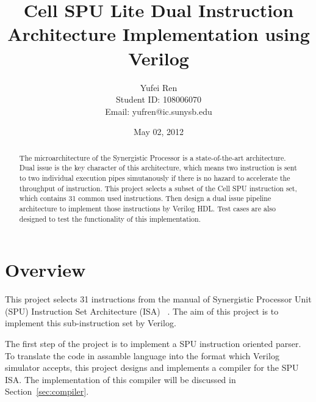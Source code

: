 \documentclass[preprint,authoryear,12pt]{elsarticle}
\begin{document}
\begin{frontmatter}

\title{Cell SPU Lite Dual Instruction Architecture Implementation using Verilog}


\author{
Yufei Ren\\
{\small Student ID: 108006070}\\
{\small Email: yufren@ic.sunysb.edu}}

\address{Department of Electrical and Computer Engineering\\
Stony Brook University, Stony Brook, New York
}

\date{May 02, 2012}

\maketitle

\begin{abstract}

The microarchitecture of the Synergistic Processor is a
state-of-the-art architecture. Dual issue is the key character of this
architecture, which means two instruction is sent to two individual
execution pipes simutanously if there is no hazard to accelerate the
throughput of instruction. This project selects a subset of the Cell
SPU instruction set, which contains 31 common used instructions. Then
design a dual issue pipeline architecture to implement those
instructions by Verilog HDL. Test cases are also designed to test the
functionality of this implementation.

\end{abstract}

\end{frontmatter}

\section{Overview}

This project selects 31 instructions from the manual of Synergistic
Processor Unit (SPU) Instruction Set Architecture (ISA) ~\cite{sony:cellspu}. The aim of
this project is to implement this sub-instruction set by Verilog.

The first step of the project is to implement a SPU instruction
oriented parser. To translate the code in assamble language into the
format which Verilog simulator accepts, this project designs and
implements a compiler for the SPU ISA. The implementation of this
compiler will be discussed in Section~\ref{sec:compiler}.
\end{document}

